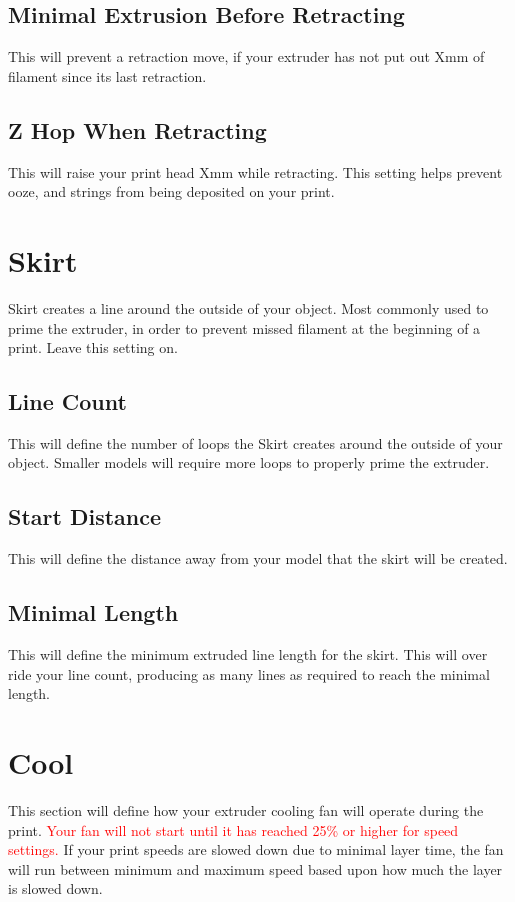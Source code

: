 \subsection{Minimal Extrusion Before Retracting}
This will prevent a retraction move, if your extruder has not put out Xmm of filament since its last retraction.

\subsection{Z Hop When Retracting}
This will raise your print head Xmm while retracting. This setting helps prevent ooze, and strings from being deposited on your print. 

\section{Skirt}
Skirt creates a line around the outside of your object. Most commonly used to prime the extruder, in order to prevent missed filament at the beginning of a print. Leave this setting on.

\subsection{Line Count}
This will define the number of loops the Skirt creates around the outside of your object. Smaller models will require more loops to properly prime the extruder.

\subsection{Start Distance}
This will define the distance away from your model that the skirt will be created. 

\subsection{Minimal Length}
This will define the minimum extruded line length for the skirt. This will over ride your line count, producing as many lines as required to reach the minimal length.

\section{Cool}
This section will define how your extruder cooling fan will operate during the print. \textcolor{red}{Your fan will not start until it has reached 25\% or higher for speed settings.} If your print speeds are slowed down due to minimal layer time, the fan will run between minimum and maximum speed based upon how much the layer is slowed down.

